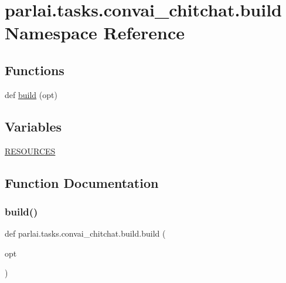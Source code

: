 \hypertarget{namespaceparlai_1_1tasks_1_1convai__chitchat_1_1build}{}\section{parlai.\+tasks.\+convai\+\_\+chitchat.\+build Namespace Reference}
\label{namespaceparlai_1_1tasks_1_1convai__chitchat_1_1build}
\subsection*{Functions}
\begin{DoxyCompactItemize}
\item 
def \hyperlink{namespaceparlai_1_1tasks_1_1convai__chitchat_1_1build_a3c8d628ed6619549434124fc4c755995}{build} (opt)
\end{DoxyCompactItemize}
\subsection*{Variables}
\begin{DoxyCompactItemize}
\item 
\hyperlink{namespaceparlai_1_1tasks_1_1convai__chitchat_1_1build_a77291224078e3075ac0ebde14d3a558b}{R\+E\+S\+O\+U\+R\+C\+ES}
\end{DoxyCompactItemize}


\subsection{Function Documentation}
\mbox{\label{namespaceparlai_1_1tasks_1_1convai__chitchat_1_1build_a3c8d628ed6619549434124fc4c755995}} 
\subsubsection{\texorpdfstring{build()}{build()}}
{\footnotesize\ttfamily def parlai.\+tasks.\+convai\+\_\+chitchat.\+build.\+build (\begin{DoxyParamCaption}\item[{}]{opt }\end{DoxyParamCaption})}



